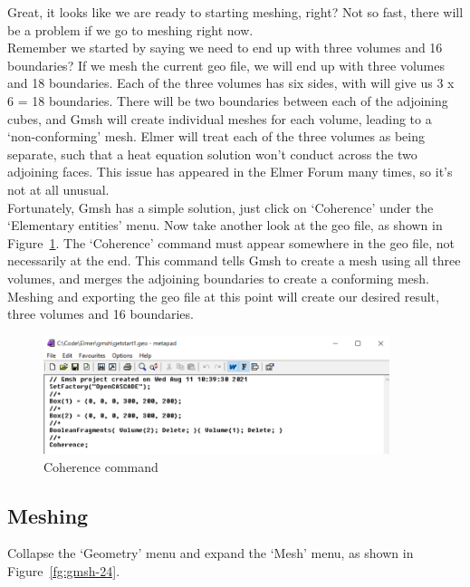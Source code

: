 Great, it looks like we are ready to starting meshing, right?  Not so fast, there will be a problem if we go to meshing right now.\\

Remember we started by saying we need to end up with three volumes and 16 boundaries?  If we mesh the current geo file, we will end up with three volumes and 18 boundaries.  Each of the three volumes has six sides, with will give us 3 x 6 = 18 boundaries.  There will be two boundaries between each of the adjoining cubes, and Gmsh will create individual meshes for each volume, leading to a `non-conforming' mesh.  Elmer will treat each of the three volumes as being separate, such that a heat equation solution won't conduct across the two adjoining faces.  This issue has appeared in the Elmer Forum many times, so it's not at all unusual.\\

Fortunately, Gmsh has a simple solution, just click on `Coherence' under the `Elementary entities' menu.  Now take another look at the geo file, as shown in Figure~\ref{fg:gmsh-23}.  The `Coherence' command must appear somewhere in the geo file, not necessarily at the end.  This command tells Gmsh to create a mesh using all three volumes, and merges the adjoining boundaries to create a conforming mesh.  Meshing and exporting the geo file at this point will create our desired result, three volumes and 16 boundaries.

\begin{figure}[H]
\centering
\includegraphics[width=0.9\textwidth]{gmsh-23}
\caption{Coherence command}\label{fg:gmsh-23}
\end{figure}

\subsection{Meshing}

Collapse the `Geometry' menu and expand the `Mesh' menu, as shown in Figure~\ref{fg:gmsh-24}.

